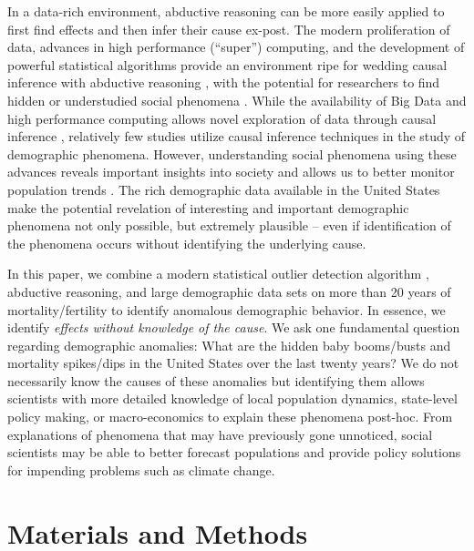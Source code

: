 \documentclass[12pt]{article}
\begin{document}
In a data-rich environment, abductive reasoning can be more easily
applied to first find effects and then infer their cause ex-post. The
modern proliferation of data, advances in high performance (``super'')
computing, and the development of powerful statistical algorithms
provide an environment ripe for wedding causal inference with abductive
reasoning \citep{van2016data, zikopoulos2011}, with the potential for
researchers to find hidden or understudied social phenomena
\citep{bohon2018demography}. While the availability of Big Data and high
performance computing allows novel exploration of data through causal
inference
\citep{bohon2018demography, rcausalimpact, shiffrin2016drawing},
relatively few studies utilize causal inference techniques in the study
of demographic phenomena. However, understanding social phenomena using
these advances reveals important insights into society
\citep{angrist1989lifetime, mas2009peers} and allows us to better
monitor population trends \citep{nobles2019, torche2015hidden}. The rich
demographic data available in the United States make the potential
revelation of interesting and important demographic phenomena not only
possible, but extremely plausible -- even if identification of the
phenomena occurs without identifying the underlying cause.

In this paper, we combine a modern statistical outlier detection
algorithm \citep{chen1993joint}, abductive reasoning, and large
demographic data sets on more than 20 years of mortality/fertility to
identify anomalous demographic behavior. In essence, we identify
\emph{effects without knowledge of the cause}. We ask one fundamental
question regarding demographic anomalies: What are the hidden baby
booms/busts and mortality spikes/dips in the United States over the last
twenty years? We do not necessarily know the causes of these anomalies
but identifying them allows scientists with more detailed knowledge of
local population dynamics, state-level policy making, or macro-economics
to explain these phenomena post-hoc. From explanations of phenomena that
may have previously gone unnoticed, social scientists may be able to
better forecast populations and provide policy solutions for impending
problems such as climate change.

\hypertarget{materials-and-methods}{%
\section{Materials and Methods}\label{materials-and-methods}}
\end{document}
